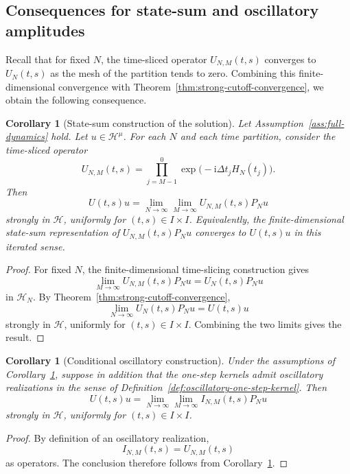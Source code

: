 \documentclass[11pt]{amsart}
\theoremstyle{plain}
\newtheorem{corollary}[theorem]{Corollary}
\theoremstyle{definition}
\theoremstyle{remark}
\newcommand{\Hilb}{\mathcal H}
\newcommand{\ii}{\mathrm i}
\begin{document}
\subsection{Consequences for state-sum and oscillatory amplitudes}

Recall that for fixed \(N\), the time-sliced operator \(U_{N,M}(t,s)\)
converges to \(U_N(t,s)\) as the mesh of the partition tends to zero.
Combining this finite-dimensional convergence with
Theorem~\ref{thm:strong-cutoff-convergence}, we obtain the following
consequence.

\begin{corollary}[State-sum construction of the solution]
\label{cor:state-sum-construction}
Let Assumption~\ref{ass:full-dynamics} hold.  Let \(u\in\Hilb^\mu\).
For each \(N\) and each time partition, consider the time-sliced operator
\[
        U_{N,M}(t,s)
        =
        \prod_{j=M-1}^{0}
        \exp\bigl(-\ii\Delta t_jH_N(t_j)\bigr).
\]
Then
\[
        U(t,s)u
        =
        \lim_{N\to\infty}
        \lim_{M\to\infty}
        U_{N,M}(t,s)P_Nu
\]
strongly in \(\Hilb\), uniformly for \((t,s)\in I\times I\).
Equivalently, the finite-dimensional state-sum representation of
\(U_{N,M}(t,s)P_Nu\) converges to \(U(t,s)u\) in this iterated sense.
\end{corollary}

\begin{proof}
For fixed \(N\), the finite-dimensional time-slicing construction gives
\[
        \lim_{M\to\infty}
        U_{N,M}(t,s)P_Nu
        =
        U_N(t,s)P_Nu
\]
in \(\Hilb_N\).  By Theorem~\ref{thm:strong-cutoff-convergence},
\[
        \lim_{N\to\infty}
        U_N(t,s)P_Nu
        =
        U(t,s)u
\]
strongly in \(\Hilb\), uniformly for \((t,s)\in I\times I\).  Combining
the two limits gives the result.
\end{proof}

\begin{corollary}[Conditional oscillatory construction]
\label{cor:oscillatory-construction}
Under the assumptions of
Corollary~\ref{cor:state-sum-construction}, suppose in addition that the
one-step kernels admit oscillatory realizations in the sense of
Definition~\ref{def:oscillatory-one-step-kernel}. Then
\[
 U(t,s)u
 =
 \lim_{N\to\infty}\lim_{M\to\infty}
 I_{N,M}(t,s)P_Nu
\]
strongly in \(\Hilb\), uniformly for \((t,s)\in I\times I\).
\end{corollary}

\begin{proof}
By definition of an oscillatory realization,
\[
 I_{N,M}(t,s)=U_{N,M}(t,s)
\]
as operators. The conclusion therefore follows from
Corollary~\ref{cor:state-sum-construction}.
\end{proof}
\end{document}
